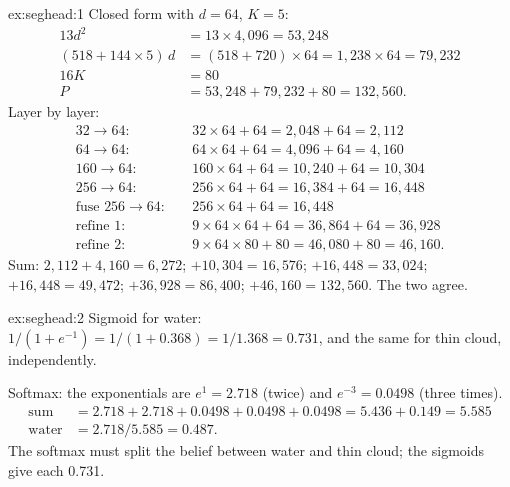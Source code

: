 
\begin{solution}{ex:seghead:1}
Closed form with $d = 64$, $K = 5$:
\begin{align*}
  13d^2 &= 13 \times 4{,}096 = 53{,}248\\
  (518 + 144 \times 5)\,d &= (518 + 720) \times 64 = 1{,}238 \times 64 = 79{,}232\\
  16K &= 80\\
  P &= 53{,}248 + 79{,}232 + 80 = 132{,}560.
\end{align*}
Layer by layer:
\begin{align*}
  32 \to 64:&\quad 32 \times 64 + 64 = 2{,}048 + 64 = 2{,}112\\
  64 \to 64:&\quad 64 \times 64 + 64 = 4{,}096 + 64 = 4{,}160\\
  160 \to 64:&\quad 160 \times 64 + 64 = 10{,}240 + 64 = 10{,}304\\
  256 \to 64:&\quad 256 \times 64 + 64 = 16{,}384 + 64 = 16{,}448\\
  \text{fuse } 256 \to 64:&\quad 256 \times 64 + 64 = 16{,}448\\
  \text{refine 1}:&\quad 9 \times 64 \times 64 + 64 = 36{,}864 + 64 = 36{,}928\\
  \text{refine 2}:&\quad 9 \times 64 \times 80 + 80 = 46{,}080 + 80 = 46{,}160.
\end{align*}
Sum: $2{,}112 + 4{,}160 = 6{,}272$; $+ 10{,}304 = 16{,}576$; $+ 16{,}448 = 33{,}024$; $+ 16{,}448 = 49{,}472$; $+ 36{,}928 = 86{,}400$;
$+ 46{,}160 = 132{,}560$. The two agree.
\end{solution}

\begin{solution}{ex:seghead:2}
Sigmoid for water: $1/(1 + e^{-1}) = 1/(1 + 0.368) = 1/1.368 = 0.731$, and the same for thin cloud, independently.

Softmax: the exponentials are $e^{1} = 2.718$ (twice) and $e^{-3} = 0.0498$ (three times).
\begin{align*}
  \text{sum} &= 2.718 + 2.718 + 0.0498 + 0.0498 + 0.0498 = 5.436 + 0.149 = 5.585\\
  \text{water} &= 2.718 / 5.585 = 0.487.
\end{align*}
The softmax must split the belief between water and thin cloud; the sigmoids give each 0.731.
\end{solution}

